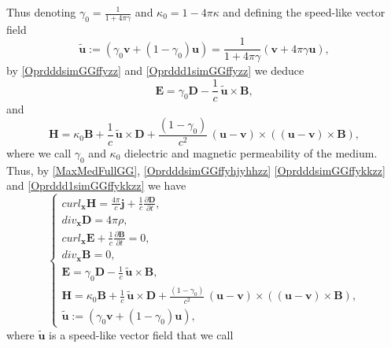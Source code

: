 \documentclass{article}
\theoremstyle{definition}
\theoremstyle{remark}
\renewcommand{\vec}[1]{\mathbf{#1}}
\newcommand{\R}{\mathbb{R}}
\newcommand{\er}{\eqref}
\newcommand{\R}{{\mathbb{R}}}
\newcommand{\er}{\eqref}
\begin{document}
Thus denoting $\gamma_0=\frac{1}{1+4\pi\gamma}$ and $\kappa_0=1-4\pi
\kappa$ and defining the speed-like vector field
\begin{equation}\label{OprdddsimGGffyhjyhhzz}
\vec {\tilde u}:=\left(\gamma_0\vec v+(1-\gamma_0)\vec
u\right)=\frac{1}{1+4\pi\gamma}\left(\vec v+4\pi\gamma\vec u\right),
\end{equation}
by \er{OprdddsimGGffyzz} and \er{Oprddd1simGGffyzz}  we deduce
\begin{equation}\label{OprdddsimGGffykkzz}
\vec E=\gamma_0\vec D-\frac{1}{c}\,\vec {\tilde u}\times \vec B,
\end{equation}
and
\begin{equation}\label{Oprddd1simGGffykkzz}
\vec H=\kappa_0\vec B+\frac{1}{c}\,\vec {\tilde u}\times \vec
D+\frac{(1-\gamma_0)}{c^2}\,(\vec u-\vec v)\times\left(\left(\vec
u-\vec v\right)\times \vec B\right),
\end{equation}
where we call $\gamma_0$ and $\kappa_0$ dielectric and magnetic
permeability of the medium. Thus, by \er{MaxMedFullGG},
\er{OprdddsimGGffyhjyhhzz} \er{OprdddsimGGffykkzz} and
\er{Oprddd1simGGffykkzz} we have
\begin{equation}\label{MaxMedFullGGffykkzz}
\begin{cases}
curl_{\vec x} \vec H=\frac{4\pi}{c}\vec j+
\frac{1}{c}\frac{\partial \vec D}{\partial t},\\
div_{\vec x} \vec D=4\pi\rho,\\
curl_{\vec x} \vec E+\frac{1}{c}\frac{\partial \vec B}{\partial t}=0,\\
div_{\vec x} \vec B=0,\\
\vec E=\gamma_0\vec D-\frac{1}{c}\,\vec {\tilde u}\times \vec B,\\
\vec H=\kappa_0\vec B+\frac{1}{c}\,\vec {\tilde u}\times \vec
D+\frac{(1-\gamma_0)}{c^2}\,(\vec u-\vec v)\times\left(\left(\vec
u-\vec v\right)\times \vec B\right),\\
\vec {\tilde u}:=\left(\gamma_0\vec v+(1-\gamma_0)\vec u\right),
\end{cases}
\end{equation}
where $\vec {\tilde u}$ is a speed-like vector field that we call
\end{document}
